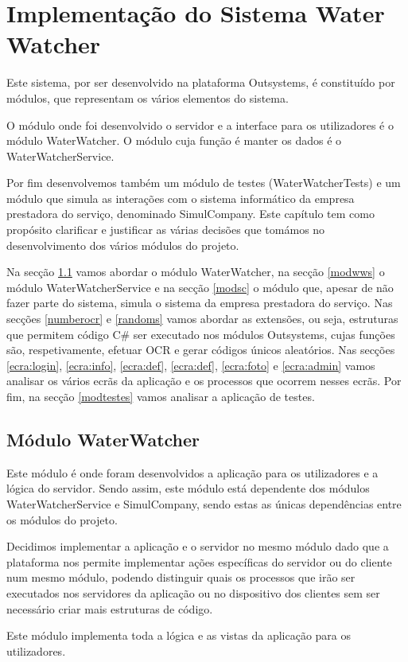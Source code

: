 \chapter{Implementação do Sistema Water Watcher} \label{cap:implementacao}

Este sistema, por ser desenvolvido na plataforma Outsystems, é constituído por módulos, que representam os vários elementos do sistema.\par
O módulo onde foi desenvolvido o servidor e a interface para os utilizadores é o módulo WaterWatcher. O módulo cuja função é manter os dados é o WaterWatcherService.\par
Por fim desenvolvemos também um módulo de testes (WaterWatcherTests) e um módulo que simula as interações com o sistema informático da empresa prestadora do serviço, denominado SimulCompany.
Este capítulo tem como propósito clarificar e justificar as várias decisões que tomámos no desenvolvimento dos vários módulos do projeto.\par
Na secção \ref{modww} vamos abordar o módulo WaterWatcher, na secção \ref{modwws} o módulo WaterWatcherService e na secção \ref{modsc} o módulo que, apesar de não fazer parte do sistema, simula o sistema da empresa prestadora do serviço. Nas secções \ref{numberocr} e \ref{randoms} vamos abordar as extensões, ou seja, estruturas que permitem código C\# ser executado nos módulos Outsystems, cujas funções são, respetivamente, efetuar OCR e gerar códigos únicos aleatórios. Nas secções \ref{ecra:login}, \ref{ecra:info}, \ref{ecra:def}, \ref{ecra:def}, \ref{ecra:foto} e \ref{ecra:admin} vamos analisar os vários ecrãs da aplicação e os processos que ocorrem nesses ecrãs. Por fim, na secção \ref{modtestes} vamos analisar a aplicação de testes.


\section{Módulo WaterWatcher} \label{modww} %
Este módulo é onde foram desenvolvidos a aplicação para os utilizadores e a lógica do servidor. Sendo assim, este módulo está dependente dos módulos WaterWatcherService e SimulCompany, sendo estas as únicas dependências entre os módulos do projeto.\par
Decidimos implementar a aplicação e o servidor no mesmo módulo dado que a plataforma nos permite implementar ações específicas do servidor ou do cliente num mesmo módulo, podendo distinguir quais os processos que irão ser executados nos servidores da aplicação ou no dispositivo dos clientes sem ser necessário criar mais estruturas de código.\par
Este módulo implementa toda a lógica e as vistas da aplicação para os utilizadores.

